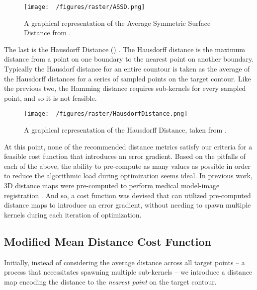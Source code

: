 \begin{figure}[h!]
  \centering
  \texttt{[image: ~/figures/raster/ASSD.png]}
  \caption{A graphical representation of the Average Symmetric Surface Distance from \cite{reinkeUnderstandingMetricrelatedPitfalls2023,reinkeCommonLimitationsImage2023}.}
  \label{fig:ASSD}
\end{figure}

The last is the Hausdorff Distance () \cite{huttenlocherMultiresolutionTechniqueComparing1993,felzenszwalbDistanceTransformsSampled2012,huttenlocherComparingImagesUsing1993}.
The Hausdorff distance is the maximum distance from a point on one boundary to the nearest point on another boundary. Typically the Hausdorf distance for an entire countour is taken as the average of the Hausdorff distances for a series of sampled points on the target contour.
Like the previous two, the Hamming distance requires sub-kernels for every sampled point, and so it is not feasible.


\begin{figure}[h!]
  \centering
  \texttt{[image: ~/figures/raster/HausdorfDistance.png]}
  \caption{A graphical representation of the Hausdorff Distance, taken from \cite{reinkeCommonLimitationsImage2023,reinkeUnderstandingMetricrelatedPitfalls2023}.}
  \label{fig:HD}
\end{figure}

At this point, none of the recommended distance metrics satisfy our criteria for a feasible cost function that introduces an error gradient.
Based on the pitfalls of each of the above, the ability to pre-compute as many values as possible in order to reduce the algorithmic load during optimization seems ideal.
In previous work, 3D distance maps were pre-computed to perform medical model-image registration \cite{lavalleeRecoveringPositionOrientation1995,zuffiModelbasedMethodReconstruction1999}.
And so, a cost function was devised that can utilized pre-computed distance maps to introduce an error gradient, without needing to spawn multiple kernels during each iteration of optimization.

\subsection{Modified Mean Distance Cost Function}
Initially, instead of considering the average distance across all target points – a process that necessitates spawning multiple sub-kernels – we introduce a distance map encoding the distance to the \emph{nearest point} on the target contour.


